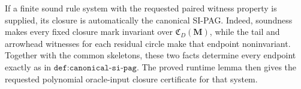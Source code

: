 If a finite sound rule system with the requested paired witness property is supplied, its closure is automatically the canonical SI-PAG.  Indeed, soundness makes every fixed closure mark invariant over \(\mathfrak C_D(\mathbf M)\), while the tail and arrowhead witnesses for each residual circle make that endpoint noninvariant.  Together with the common skeletons, these two facts determine every endpoint exactly as in \(\texttt{def:canonical-si-pag}\).  The proved runtime lemma then gives the requested polynomial oracle-input closure certificate for that system.